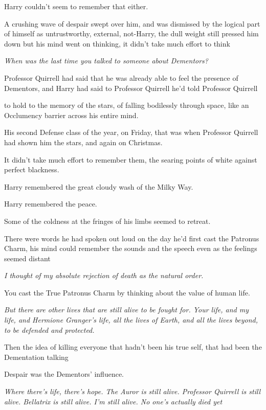 Harry couldn't seem to remember that either.

A crushing wave of despair swept over him, and was dismissed by the logical
part of himself as untrustworthy, external, not-Harry, the dull weight still
pressed him down but his mind went on thinking, it didn't take much effort to
think{\el}

\emph{When was the last time you talked to someone about Dementors?}

Professor Quirrell had said that he was already able to feel the presence of
Dementors, and Harry had said to Professor Quirrell{\el} he'd told Professor
Quirrell{\el}

{\el} to hold to the memory of the stars, of falling bodilessly through
space, like an Occlumency barrier across his entire mind.

His second Defense class of the year, on Friday, that was when Professor
Quirrell had shown him the stars, and again on Christmas.

It didn't take much effort to remember them, the searing points of white
against perfect blackness.

Harry remembered the great cloudy wash of the Milky Way.

Harry remembered the peace.

Some of the coldness at the fringes of his limbs seemed to retreat.

There were words he had spoken out loud on the day he'd first cast the Patronus
Charm, his mind could remember the sounds and the speech even as the feelings
seemed distant{\el}

{\el} \emph{I thought of my absolute rejection of death as the natural order.}

You cast the True Patronus Charm by thinking about the value of human life.

\emph{{\el} But there are other lives that are still alive to be fought for.
Your life, and my life, and Hermione Granger's life, all the lives of Earth,
and all the lives beyond, to be defended and protected.}

Then the idea of killing everyone{\el} that hadn't been his true self, that
had been the Dementation talking{\el}

Despair was the Dementors' influence.

\emph{Where there's life, there's hope. The Auror is still alive. Professor
Quirrell is still alive. Bellatrix is still alive. I'm still alive. No one's
actually died yet{\el}}

